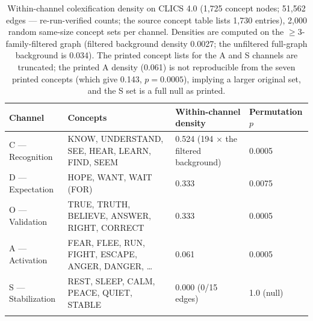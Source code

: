 \documentclass[11pt,twocolumn]{article}
\theoremstyle{plain}
\begin{document}
\begin{table}[t]
\centering\small
\caption{Within-channel colexification density on CLICS 4.0 (1,725 concept nodes; 51,562 edges --- re-run-verified counts; the source concept table lists 1,730 entries), 2,000 random same-size concept sets per channel. Densities are computed on the $\geq 3$-family-filtered graph (filtered background density 0.0027; the unfiltered full-graph background is 0.034). The printed concept lists for the A and S channels are truncated; the printed A density (0.061) is not reproducible from the seven printed concepts (which give 0.143, $p = 0.0005$), implying a larger original set, and the S set is a full null as printed.}
\label{tab:clics}
\begin{tabular}{@{}p{}p{}p{}p{}@{}}
\toprule
Channel & Concepts & Within-channel density & Permutation $p$ \\
\midrule
C — Recognition & KNOW, UNDERSTAND, SEE, HEAR, LEARN, FIND, SEEM & 0.524 (194 $\times$ the filtered background) & 0.0005 \\
\addlinespace
D — Expectation & HOPE, WANT, WAIT (FOR) & 0.333 & 0.0075 \\
\addlinespace
O — Validation & TRUE, TRUTH, BELIEVE, ANSWER, RIGHT, CORRECT & 0.333 & 0.0005 \\
\addlinespace
A — Activation & FEAR, FLEE, RUN, FIGHT, ESCAPE, ANGER, DANGER, \dots{} & 0.061 & 0.0005 \\
\addlinespace
S — Stabilization & REST, SLEEP, CALM, PEACE, QUIET, STABLE & 0.000 (0/15 edges) & 1.0 (null) \\
\addlinespace
\bottomrule
\end{tabular}
\end{table}
\end{document}
